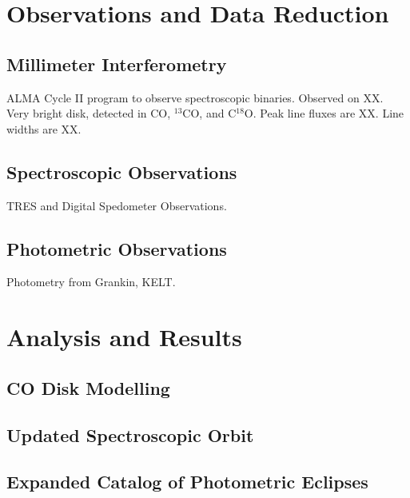 \documentclass{aastex6}
\begin{document}
\section{Observations and Data Reduction}

\subsection{Millimeter Interferometry}

ALMA Cycle II program to observe spectroscopic binaries. Observed on XX. Very bright disk, detected in CO, ${}^{13}$CO, and C${}^{18}$O. Peak line fluxes are XX. Line widths are XX.

\subsection{Spectroscopic Observations}

TRES and Digital Spedometer Observations.

\subsection{Photometric Observations}

Photometry from Grankin, KELT.

\section{Analysis and Results}

\subsection{CO Disk Modelling}

\subsection{Updated Spectroscopic Orbit}

\subsection{Expanded Catalog of Photometric Eclipses}
\end{document}

